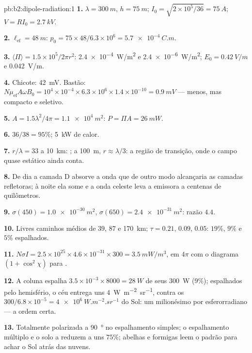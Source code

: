 \begin{solution}{pb:b2:dipole-radiation:1}
\textbf{1.} $\lambda = \qty{300}{m}$, $h = \qty{75}{m}$; $I_0 = \sqrt{2 \times 10^5/36} = \qty{75}{A}$;
$V = RI_0 = \qty{2.7}{kV}$.

\textbf{2.} $\ell_{\text{ef}} = \qty{48}{m}$: $p_0 = 75 \times 48/6.3 \times 10^6 = \qty{5.7e-4}{C.m}$.

\textbf{3.} $\langle\Pi\rangle = 1.5 \times 10^5/2\pi r^2$: \qty{2.4e-4}{W/m^2} e \qty{2.4e-6}{W/m^2};
$E_0 = \qty{0.42}{V/m}$ e \qty{0.042}{V/m}.

\textbf{4.} Chicote: \qty{42}{mV}. Bastão: $N\mu_{\text{ef}}A\omega B_0 = 10^4 \times 10^{-4} \times 6.3 \times
10^6 \times 1.4 \times 10^{-10} = \qty{0.9}{mV}$ --- menos, mas compacto e seletivo.

\textbf{5.} $A = 1.5\lambda^2/4\pi = \qty{1.1e4}{m^2}$: $P = \Pi A = \qty{26}{mW}$.

\textbf{6.} $36/38 = 95\%$; \qty{5}{kW} de calor.

\textbf{7.} $r/\lambda = 33$ a \qty{10}{km}: ; a \qty{100}{m},
$r \approx \lambda/3$: a região de transição, onde o campo quase estático ainda
conta.

\textbf{8.} De dia a camada D absorve a onda que de outro modo
alcançaria as camadas refletoras; à noite ela some e a onda celeste
leva a emissora a centenas de quilômetros.

\textbf{9.} $\sigma(450) = \qty{1.0e-30}{m^2}$, $\sigma(650) = \qty{2.4e-31}{m^2}$: razão $4.4$.

\textbf{10.} Livres caminhos médios de $39$, $87$ e \qty{170}{km}; $\tau = 0.21$, $0.09$, $0.05$:
$19\%$, $9\%$ e $5\%$ espalhados.

\textbf{11.} $N\sigma I = 2.5 \times 10^{25} \times 4.6 \times 10^{-31} \times 300 = \qty{3.5}{mW/m^3}$,
em $4\pi$ com o diagrama $(1 + \cos^2\chi)$ para .

\textbf{12.} A coluna espalha $3.5 \times 10^{-3} \times 8000 = \qty{28}{W}$ de seus
\qty{300}{W} ($9\%$); espalhados pelo hemisfério, o céu entrega uns
\qty{4}{W.m^{-2}.sr^{-1}}, contra os $300/6.8 \times 10^{-5} = \qty{4e6}{W.m^{-2}.sr^{-1}}$ do Sol:
um milionésimo por esferorradiano --- a ordem certa.

\textbf{13.} Totalmente polarizada a \qty{90}{\degree} no espalhamento simples; o espalhamento
múltiplo e o solo a reduzem a uns $75\%$; abelhas e formigas leem
o padrão para achar o Sol atrás das nuvens.


\end{solution}
